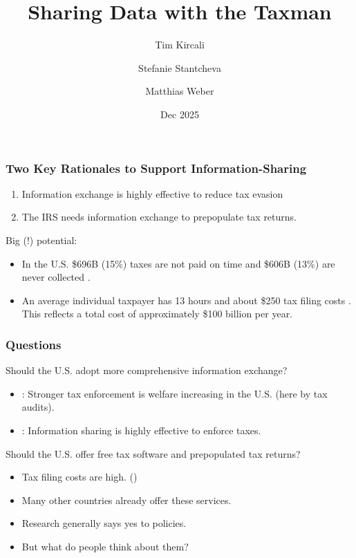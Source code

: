\documentclass{beamer}
\title[Sharing Data with the Taxman]{Sharing Data with the Taxman} %
\author[Kircali, Stantcheva and Weber] %
{Tim Kircali\inst{1} \and Stefanie Stantcheva\inst{2} \and Matthias Weber\inst{1}}
\institute[] %
{
\inst{1} University of St.Gallen \\
\inst{2} Harvard University
}
{
\medskip

}
\date[St.Gallen, Nov 2025]{Dec 2025}%
\begin{document}
\begin{frame}
\titlepage %
\end{frame}


\begin{frame}
\frametitle{Two Key Rationales to Support Information-Sharing}
\begin{enumerate}
    \item Information exchange is \alert{highly effective to reduce tax evasion} \parencite{kleven2011unwilling,pomeranz2015no,slemrod2017does}
    \vspace{0.5em}
    \item The IRS needs information exchange to \alert{prepopulate tax returns}.
\end{enumerate}
\vspace{2em}
Big (!) potential: 
\vspace{0.5em}
\begin{itemize}
    \item In the U.S. \$696B (15\%) taxes are not paid on time and \$606B (13\%) are never collected \parencite{IRS_TaxGap_2022_Pub5869}.
    \vspace{0.5em}
    \item An average individual taxpayer has 13 hours and about \$250 tax filing costs \parencite{IRS2022}. This reflects a total cost of approximately \$100 billion per year. 
\end{itemize}
\end{frame}

\begin{frame}
\frametitle{Questions}
Should the U.S. adopt more comprehensive information exchange? 
\begin{itemize}
    \item \cite{boning2025welfare}: Stronger tax enforcement is welfare increasing in the U.S. (here by tax audits).
    \item \cite{kleven2011unwilling,pomeranz2015no,slemrod2017does}: Information sharing is highly effective to enforce taxes. 
\end{itemize}
\vspace{1em}
Should the U.S. offer free tax software and prepopulated tax returns?
\begin{itemize}
    \item Tax filing costs are high. (\cite{IRS2022}) \\[0.2em]
    \item Many other countries already offer these services.
\end{itemize}
\vspace{1em}
\begin{itemize}
    \item[$\Rightarrow$] \alert{Research generally says yes to policies.} 
    \item[$\Rightarrow$] \alert{But what do people think about them?}
\end{itemize}
\end{frame}
\end{document}
